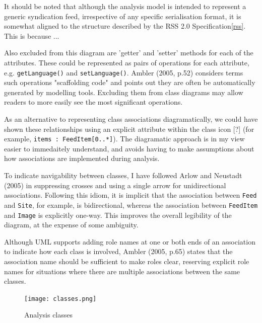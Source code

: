 \documentclass{article}
\begin{document}
It should be noted that although the analysis model is intended to represent a generic syndication feed, irrespective of any specific serialisation format, it is somewhat aligned to the structure described by the RSS 2.0 Specification\ref{rss}. This is because ...

Also excluded from this diagram are 'getter' and 'setter' methods for each of the attributes. These could be represented as pairs of operations for each attribute, e.g. \texttt{getLanguage()} and \texttt{setLanguage()}. Ambler (2005, p.52) considers terms such operations "scaffolding code" and points out they are often be automatically generated by modelling tools. Excluding them from class diagrams may allow readers to more easily see the most significant operations.

As an alternative to representing class associations diagramatically, we could have shown these relationships using an explicit attribute within the class icon [?] (for example, \texttt{items : FeedItem[0..*]}). The diagramatic approach is in my view easier to immedaitely understand, and avoids having to make assumptions about how associations are implemented during analysis.

To indicate navigability between classes, I have followed Arlow and Neustadt (2005) in suppressing crosses and using a single arrow for unidirectional associations. Following this idiom, it is implicit that the association between \texttt{Feed} and \texttt{Site}, for example, is bidirectional, whereas the association between \texttt{FeedItem} and \texttt{Image} is explicitly one-way. This improves the overall legibility of the diagram, at the expense of some ambiguity.

Although UML supports adding role names at one or both ends of an association to indicate how each class is involved, Ambler (2005, p.65) states that the association name should be sufficient to make roles clear, reserving explicit role names for situations where there are multiple associations between the same classes.




\begin{figure}
  \begin{center}
    \texttt{[image: classes.png]}
  \end{center}
  \label{analysis-classes}
  \caption{Analysis classes}
\end{figure}
\end{document}
